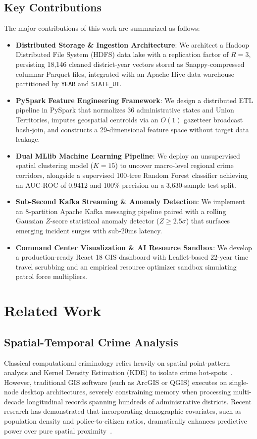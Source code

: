 \documentclass[conference]{IEEEtran}
\begin{document}
\subsection{Key Contributions}
The major contributions of this work are summarized as follows:
\begin{itemize}
    \item \textbf{Distributed Storage \& Ingestion Architecture}: We architect a Hadoop Distributed File System (HDFS) data lake with a replication factor of $R=3$, persisting 18,146 cleaned district-year vectors stored as Snappy-compressed columnar Parquet files, integrated with an Apache Hive data warehouse partitioned by \texttt{YEAR} and \texttt{STATE\_UT}.
    \item \textbf{PySpark Feature Engineering Framework}: We design a distributed ETL pipeline in PySpark that normalizes 36 administrative states and Union Territories, imputes geospatial centroids via an $O(1)$ gazetteer broadcast hash-join, and constructs a 29-dimensional feature space without target data leakage.
    \item \textbf{Dual MLlib Machine Learning Pipeline}: We deploy an unsupervised spatial clustering model ($K=15$) to uncover macro-level regional crime corridors, alongside a supervised 100-tree Random Forest classifier achieving an AUC-ROC of 0.9412 and 100\% precision on a 3,630-sample test split.
    \item \textbf{Sub-Second Kafka Streaming \& Anomaly Detection}: We implement an 8-partition Apache Kafka messaging pipeline paired with a rolling Gaussian $Z$-score statistical anomaly detector ($Z \ge 2.5\sigma$) that surfaces emerging incident surges with sub-20ms latency.
    \item \textbf{Command Center Visualization & AI Resource Sandbox}: We develop a production-ready React 18 GIS dashboard with Leaflet-based 22-year time travel scrubbing and an empirical resource optimizer sandbox simulating patrol force multipliers.
\end{itemize}

\section{Related Work}
\subsection{Spatial-Temporal Crime Analysis}
Classical computational criminology relies heavily on spatial point-pattern analysis and Kernel Density Estimation (KDE) to isolate crime hot-spots~\cite{chainey2008utility}. However, traditional GIS software (such as ArcGIS or QGIS) executes on single-node desktop architectures, severely constraining memory when processing multi-decade longitudinal records spanning hundreds of administrative districts. Recent research has demonstrated that incorporating demographic covariates, such as population density and police-to-citizen ratios, dramatically enhances predictive power over pure spatial proximity~\cite{brantingham1993nodes}.
\end{document}
